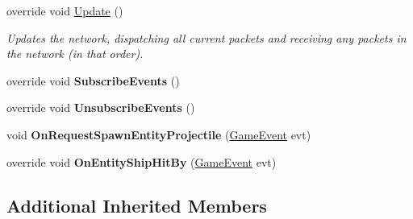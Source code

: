 \begin{DoxyCompactItemize}
override void \hyperlink{class_skyrates_1_1_client_1_1_network_1_1_dummy_client_a293ecc1918e24e8da6002a2491277333}{Update} ()
\begin{DoxyCompactList}\small\item\em Updates the network, dispatching all current packets and receiving any packets in the network (in that order). \end{DoxyCompactList}\item 
\hypertarget{class_skyrates_1_1_client_1_1_network_1_1_dummy_client_aa917662499560c267709d5704f2cdfb1}{override void {\bfseries Subscribe\-Events} ()}\label{class_skyrates_1_1_client_1_1_network_1_1_dummy_client_aa917662499560c267709d5704f2cdfb1}

\item 
\hypertarget{class_skyrates_1_1_client_1_1_network_1_1_dummy_client_a369ccdfe91669af037a8aaf2ea4a8aae}{override void {\bfseries Unsubscribe\-Events} ()}\label{class_skyrates_1_1_client_1_1_network_1_1_dummy_client_a369ccdfe91669af037a8aaf2ea4a8aae}

\item 
\hypertarget{class_skyrates_1_1_client_1_1_network_1_1_dummy_client_a28fc0eeeeeabbc95499fd43d8ddb5a92}{void {\bfseries On\-Request\-Spawn\-Entity\-Projectile} (\hyperlink{class_skyrates_1_1_client_1_1_game_1_1_event_1_1_game_event}{Game\-Event} evt)}\label{class_skyrates_1_1_client_1_1_network_1_1_dummy_client_a28fc0eeeeeabbc95499fd43d8ddb5a92}

\item 
\hypertarget{class_skyrates_1_1_client_1_1_network_1_1_dummy_client_ae43c30a66d4bde821a82702ec26adafa}{override void {\bfseries On\-Entity\-Ship\-Hit\-By} (\hyperlink{class_skyrates_1_1_client_1_1_game_1_1_event_1_1_game_event}{Game\-Event} evt)}\label{class_skyrates_1_1_client_1_1_network_1_1_dummy_client_ae43c30a66d4bde821a82702ec26adafa}

\end{DoxyCompactItemize}
\subsection*{Additional Inherited Members}


